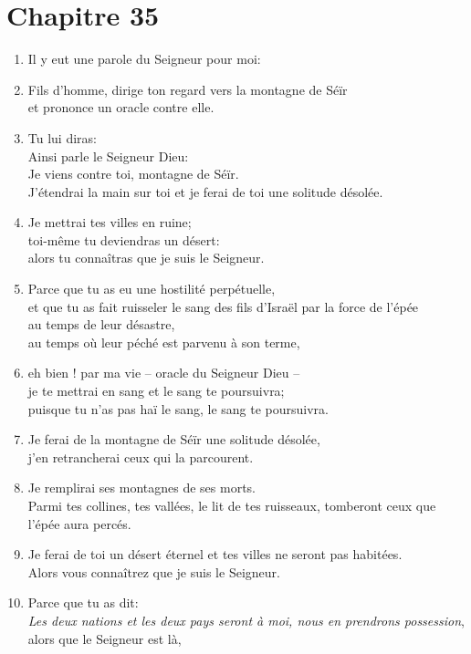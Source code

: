 \documentclass[12pt,a4paper,titlepage]{article}
\def \pslabelsep{0.2em} %
\def \psleftmargin{0em} %
\begin{document}
\section*{Chapitre 35}
\begin{enumerate}[leftmargin=\psleftmargin, labelsep = \pslabelsep, label={\arabic*}, font=\color{\pscolor}\small\textsuperscript, parsep=0em, itemsep=0em, topsep=0em ]
\item Il y eut une parole du Seigneur pour moi:
\item Fils d’homme, dirige ton regard vers la montagne de Séïr \\ et prononce un oracle contre elle.
\item Tu lui diras: \\ Ainsi parle le Seigneur Dieu: \\ Je viens contre toi, montagne de Séïr. \\
J’étendrai la main sur toi et je ferai de toi une solitude désolée.
\item Je mettrai tes villes en ruine; \\ toi-même tu deviendras un désert: \\ alors tu connaîtras que je suis le Seigneur.
\item Parce que tu as eu une hostilité perpétuelle, \\ et que tu as fait ruisseler le sang des fils d’Israël par la force de l’épée \\ au temps de leur désastre, \\ au temps où leur péché est parvenu à son terme,
\item eh bien ! par ma vie – oracle du Seigneur Dieu – \\ je te mettrai en sang et le sang te poursuivra; \\ puisque tu n’as pas haï le sang, le sang te poursuivra.
\item Je ferai de la montagne de Séïr une solitude désolée, \\ j’en retrancherai ceux qui la parcourent.
\item Je remplirai ses montagnes de ses morts. \\ Parmi tes collines, tes vallées, le lit de tes ruisseaux, tomberont ceux que l’épée aura percés.
\item Je ferai de toi un désert éternel et tes villes ne seront pas habitées. \\ Alors vous connaîtrez que je suis le Seigneur.
\item Parce que tu as dit: \\ \og{}\emph{Les deux nations et les deux pays seront à moi, nous en prendrons possession}\fg{}, \\ alors que le Seigneur est là,

\end{enumerate}
\end{document}
